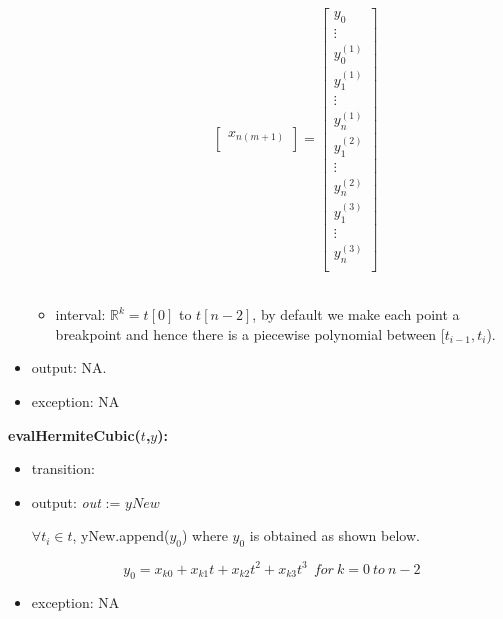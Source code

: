 \documentclass[12pt, titlepage]{article}
\begin{document}
\begin{itemize}
\begin{itemize}
\begin{enumerate}
\begin{equation*}
\begin{bmatrix}
		x_{n(m+1)} \\
		\end{bmatrix} = 
		\begin{bmatrix}
		y_0  \\
		\vdots \\
		y_0 ^{(1)} \\
		y_1 ^{(1)} \\
		\vdots \\
		y_n ^{(1)} \\
		y_1 ^{(2)} \\
		\vdots \\
		y_n ^{(2)} \\  
		y_1 ^{(3)} \\
		\vdots \\
		y_n ^{(3)} \\ 
		\end{bmatrix}
		\end{equation*}\\ 
		
		\end{enumerate}
		\item interval: $\mathbb{R}^{k} = t[0] $ to $t[n-2]$, by default we 
		make each point a breakpoint and hence there is a piecewise polynomial 
		between [$t_{i-1},t_i$).
	\end{itemize}	
	
	\item output: NA.	
	
\item exception: NA 
\end{itemize}



\noindent \textbf{evalHermiteCubic($t$,$y$):}
\begin{itemize}
	\item transition: 
		
	\item output:  \textit{out} := $yNew$
	
	$\forall t_i \in t$, yNew.append($y_0$) where $y_0$ is obtained as shown 
	below.
	
	\begin{equation*}
	y_0 = x_{k0} + x_{k1} t + x_{k2} t^{2} + x_{k3} t^{3}\ \ for\ k = 0\ to\ n-2
	\end{equation*}
	
	\item exception: NA
\end{itemize}



\end{document}
